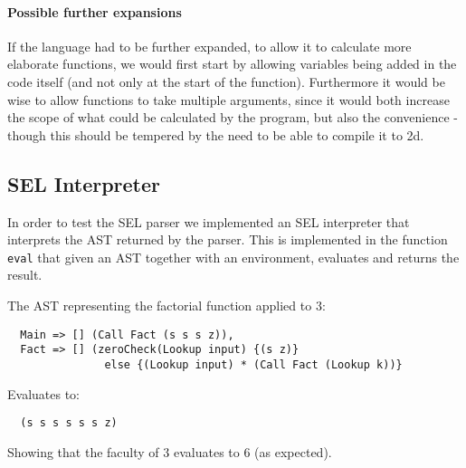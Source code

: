 \paragraph{Possible further expansions}
If the language had to be further expanded, to allow it to calculate
more elaborate functions, we would first start by allowing variables
being added in the code itself (and not only at the start of the
function). Furthermore it would be wise to allow functions to take
multiple arguments, since it would both increase the scope of what
could be calculated by the program, but also the convenience - though
this should be tempered by the need to be able to compile it to
2d.

\subsection{SEL Interpreter}
In order to test the SEL parser we implemented an SEL interpreter
that interprets the AST returned by the parser. This is implemented
in the function \texttt{eval} that given an AST together with an
environment, evaluates and returns the result.

\begin{samepage}
  \begin{exmp}
    The AST representing the factorial function applied to $3$:
\begin{verbatim}
  Main => [] (Call Fact (s s s z)),
  Fact => [] (zeroCheck(Lookup input) {(s z)}
               else {(Lookup input) * (Call Fact (Lookup k))}
\end{verbatim}
    Evaluates to:
\begin{verbatim}
  (s s s s s s z)
\end{verbatim}
    Showing that the faculty of $3$ evaluates to $6$ (as expected).
  \end{exmp}
\end{samepage}


